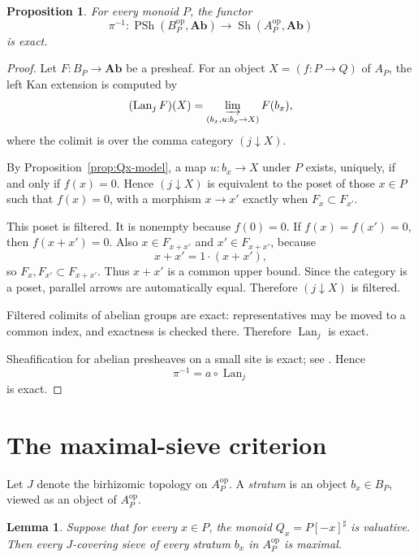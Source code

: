\documentclass[12pt]{article}
\newtheorem{proposition}[theorem]{Proposition}
\newtheorem{lemma}[theorem]{Lemma}
\theoremstyle{definition}
\theoremstyle{remark}
\numberwithin{equation}{section}
\newcommand{\op}{\mathrm{op}}
\newcommand{\Ab}{\mathbf{Ab}}
\newcommand{\PSh}{\operatorname{PSh}}
\newcommand{\Sh}{\operatorname{Sh}}
\newcommand{\Lan}{\operatorname{Lan}}
\begin{document}
\begin{proposition}\label{prop:pi-inverse-exact}
For every monoid \(P\), the functor
\[
\pi^{-1}:\PSh(B_P^{\op},\Ab)\longrightarrow \Sh(A_P^{\op},\Ab)
\]
is exact.
\end{proposition}

\begin{proof}
Let \(F:B_P\to \Ab\) be a presheaf.  For an object \(X=(f:P\to Q)\) of \(A_P\), the left Kan extension is computed by
\[
(\Lan_jF)(X)=\varinjlim_{(b_x,u:b_x\to X)} F(b_x),
\]
where the colimit is over the comma category \((j\downarrow X)\).

By Proposition~\ref{prop:Qx-model}, a map \(u:b_x\to X\) under \(P\) exists, uniquely, if and only if \(f(x)=0\).  Hence \((j\downarrow X)\) is equivalent to the poset of those \(x\in P\) such that \(f(x)=0\), with a morphism \(x\to x'\) exactly when \(F_x\subset F_{x'}\).

This poset is filtered.  It is nonempty because \(f(0)=0\).  If \(f(x)=f(x')=0\), then \(f(x+x')=0\).  Also \(x\in F_{x+x'}\) and \(x'\in F_{x+x'}\), because
\[
x+x'=1\cdot (x+x'),
\]
so \(F_x,F_{x'}\subset F_{x+x'}\).  Thus \(x+x'\) is a common upper bound.  Since the category is a poset, parallel arrows are automatically equal.  Therefore \((j\downarrow X)\) is filtered.

Filtered colimits of abelian groups are exact: representatives may be moved to a common index, and exactness is checked there.  Therefore \(\Lan_j\) is exact.

Sheafification for abelian presheaves on a small site is exact; see \cite[Exp.~II, Prop.~3.4]{SGA4}.  Hence
\[
\pi^{-1}=a\circ \Lan_j
\]
is exact.
\end{proof}

\section{The maximal-sieve criterion}

Let \(J\) denote the birhizomic topology on \(A_P^{\op}\).  A \emph{stratum} is an object \(b_x\in B_P\), viewed as an object of \(A_P^{\op}\).

\begin{lemma}\label{lem:valuative-strata-max}
Suppose that for every \(x\in P\), the monoid \(Q_x=P[-x]^\sharp\) is valuative.  Then every \(J\)-covering sieve of every stratum \(b_x\) in \(A_P^{\op}\) is maximal.
\end{lemma}
\end{document}
